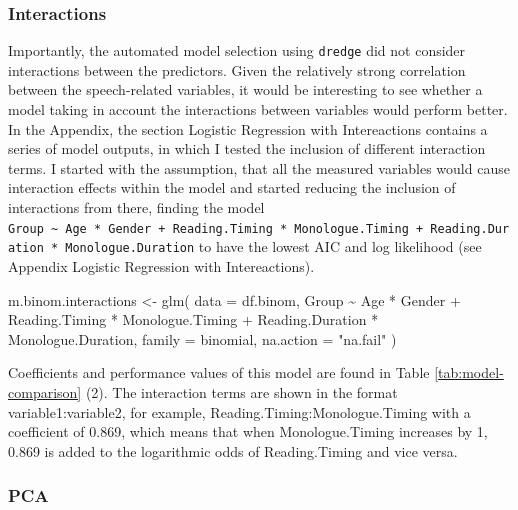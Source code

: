 \documentclass[
  english,
  doc,floatsintext]{apa6}
\newenvironment{Shaded}{\begin{snugshade}}{\end{snugshade}}
\newcommand{\AttributeTok}[1]{\textcolor[rgb]{0.77,0.63,0.00}{#1}}
\newcommand{\FunctionTok}[1]{\textcolor[rgb]{0.00,0.00,0.00}{#1}}
\newcommand{\NormalTok}[1]{#1}
\newcommand{\OtherTok}[1]{\textcolor[rgb]{0.56,0.35,0.01}{#1}}
\newcommand{\SpecialCharTok}[1]{\textcolor[rgb]{0.00,0.00,0.00}{#1}}
\newcommand{\StringTok}[1]{\textcolor[rgb]{0.31,0.60,0.02}{#1}}
\begin{document}
\hypertarget{interactions}{%
\subsubsection{Interactions}\label{interactions}}

Importantly, the automated model selection using \texttt{dredge} did not consider interactions between the predictors.
Given the relatively strong correlation between the speech-related variables, it would be interesting to see
whether a model taking in account the interactions between variables would perform better. In the Appendix, the section
Logistic Regression with Intereactions contains a series of model outputs, in which I tested the inclusion of different
interaction terms. I started with the assumption, that all the measured variables would cause interaction effects
within the model and started reducing the inclusion of interactions from there, finding the model
\texttt{Group\ \textasciitilde{}\ Age\ *\ Gender\ +\ Reading.Timing\ *\ Monologue.Timing\ +\ Reading.Duration\ *\ Monologue.Duration} to have the lowest
AIC and log likelihood (see Appendix Logistic Regression with Intereactions).

\begin{Shaded}
\begin{Highlighting}[]
\NormalTok{m.binom.interactions }\OtherTok{\textless{}{-}} \FunctionTok{glm}\NormalTok{(}
    \AttributeTok{data =}\NormalTok{ df.binom, Group }\SpecialCharTok{\textasciitilde{}}\NormalTok{ Age }\SpecialCharTok{*}\NormalTok{ Gender }\SpecialCharTok{+}\NormalTok{ Reading.Timing }\SpecialCharTok{*}
\NormalTok{        Monologue.Timing }\SpecialCharTok{+}\NormalTok{ Reading.Duration }\SpecialCharTok{*}\NormalTok{ Monologue.Duration,}
    \AttributeTok{family =}\NormalTok{ binomial,}
    \AttributeTok{na.action =} \StringTok{"na.fail"}
\NormalTok{)}
\end{Highlighting}
\end{Shaded}

Coefficients and performance values of this model are found in Table \ref{tab:model-comparison} (2). The interaction
terms are shown in the format variable1:variable2, for example, Reading.Timing:Monologue.Timing with a coefficient of
0.869, which means that when Monologue.Timing increases by 1, 0.869 is added to the logarithmic odds of Reading.Timing
and vice versa.

\hypertarget{pca}{%
\subsubsection{PCA}\label{pca}}
\end{document}
